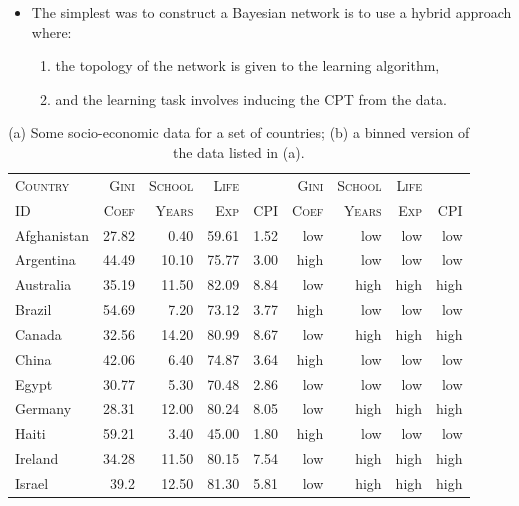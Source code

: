 \documentclass[xcolor={table}]{beamer}
\newcommand{\featN}[1]{\textsc{#1}}
\begin{document}
\begin{frame}
	\begin{itemize}
		\item The simplest was to construct a Bayesian network is to use a hybrid approach where:
		\begin{enumerate}
			\item the topology of the network is given to the learning algorithm,
			\item and the learning task involves inducing the CPT from the data.
		\end{enumerate}
	\end{itemize}
\end{frame}

 \begin{frame} 
\begin{table}[htb]
	\caption{(a) Some socio-economic data for a set of countries; (b) a binned version of the data listed in (a).}
	\label{tab:corrdata}
\begin{tiny}
		\begin{tabular}{l|rrrr|rrrr}
\hline		
\featN{Country} & \featN{Gini} & \featN{School} & \featN{Life} & ~ & \featN{Gini} & \featN{School} & \featN{Life} & ~\\
\featN{ID} & \featN{Coef} & \featN{Years} & \featN{Exp} & \featN{CPI} &\featN{Coef} & \featN{Years} & \featN{Exp} & \featN{CPI}\\
\hline
Afghanistan & 27.82 & 0.40 & 59.61 & 1.52 & low & low & low & low\\
Argentina & 44.49 & 10.10 & 75.77 & 3.00 & high & low & low & low\\
Australia & 35.19 & 11.50 & 82.09 & 8.84 & low & high & high & high\\
Brazil & 54.69 & 7.20 & 73.12 & 3.77 & high & low & low & low\\
Canada & 32.56 & 14.20 & 80.99 & 8.67 & low & high & high & high\\
China & 42.06 & 6.40 & 74.87 & 3.64 & high & low & low & low\\
Egypt & 30.77 & 5.30 & 70.48 & 2.86 & low & low & low & low\\
Germany & 28.31 & 12.00 & 80.24 & 8.05 & low & high & high & high\\
Haiti & 59.21 & 3.40 & 45.00 & 1.80 & high & low & low & low\\
Ireland & 34.28 & 11.50 & 80.15 & 7.54 & low & high & high & high\\
Israel & 39.2 & 12.50 & 81.30 & 5.81 & low & high & high & high\\

\end{tabular}
\end{tiny}
\end{table}
\end{frame}
\end{document}
